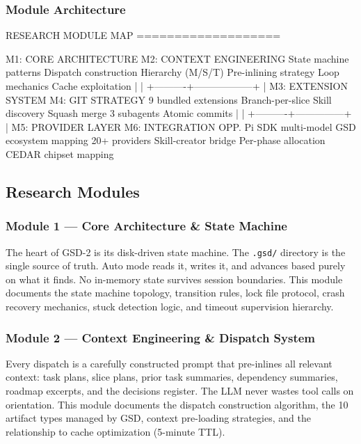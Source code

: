 \documentclass[11pt,letterpaper]{article}
\begin{document}
\subsubsection{Module Architecture}

\begin{asciibox}
RESEARCH MODULE MAP
===================

  M1: CORE ARCHITECTURE        M2: CONTEXT ENGINEERING
  State machine patterns        Dispatch construction
  Hierarchy (M/S/T)            Pre-inlining strategy
  Loop mechanics               Cache exploitation
        |                             |
        +----------+------------------+
                   |
          M3: EXTENSION SYSTEM        M4: GIT STRATEGY
          9 bundled extensions        Branch-per-slice
          Skill discovery             Squash merge
          3 subagents                 Atomic commits
                |                          |
                +----------+---------------+
                           |
              M5: PROVIDER LAYER      M6: INTEGRATION OPP.
              Pi SDK multi-model      GSD ecosystem mapping
              20+ providers           Skill-creator bridge
              Per-phase allocation    CEDAR chipset mapping
\end{asciibox}

\subsection{Research Modules}

\subsubsection{Module 1 — Core Architecture \& State Machine}

The heart of GSD-2 is its disk-driven state machine. The \texttt{.gsd/} directory is the single source of truth. Auto mode reads it, writes it, and advances based purely on what it finds. No in-memory state survives session boundaries. This module documents the state machine topology, transition rules, lock file protocol, crash recovery mechanics, stuck detection logic, and timeout supervision hierarchy.

\subsubsection{Module 2 — Context Engineering \& Dispatch System}

Every dispatch is a carefully constructed prompt that pre-inlines all relevant context: task plans, slice plans, prior task summaries, dependency summaries, roadmap excerpts, and the decisions register. The LLM never wastes tool calls on orientation. This module documents the dispatch construction algorithm, the 10 artifact types managed by GSD, context pre-loading strategies, and the relationship to cache optimization (5-minute TTL).
\end{document}
